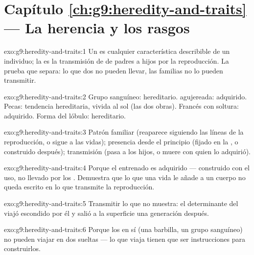 \section*{Capítulo \ref{ch:g9:heredity-and-traits} --- La herencia y los rasgos}

\begin{solution}{exo:g9:heredity-and-traits:1}
Un  es cualquier característica describible de un individuo; la
 es la transmisión de  de padres a hijos por la
reproducción. La prueba que separa: lo que dos  no pueden
llevar, las familias no lo pueden transmitir.
\end{solution}

\begin{solution}{exo:g9:heredity-and-traits:2}
Grupo sanguíneo: hereditario.  agujereada: adquirido. Pecas:
tendencia hereditaria, vivida al sol (las dos obras). Francés con
soltura: adquirido. Forma del lóbulo: hereditario.
\end{solution}

\begin{solution}{exo:g9:heredity-and-traits:3}
Patrón familiar (reaparece siguiendo las líneas de la reproducción, o
sigue a las vidas); presencia desde el principio (fijado en la
, o construido después); transmisión (pasa a los hijos, o
muere con quien lo adquirió).
\end{solution}

\begin{solution}{exo:g9:heredity-and-traits:4}
Porque el  entrenado es adquirido --- construido con el uso, no
llevado por los . Demuestra que lo que una vida le añade a un
cuerpo no queda escrito en lo que transmite la reproducción.
\end{solution}

\begin{solution}{exo:g9:heredity-and-traits:5}
Transmitir lo que no muestra: el determinante del  viajó
escondido por él y salió a la superficie una generación después.
\end{solution}

\begin{solution}{exo:g9:heredity-and-traits:6}
Porque los  en sí (una barbilla, un grupo sanguíneo) no pueden
viajar en dos  sueltas --- lo que viaja tienen que ser
instrucciones para construirlos.
\end{solution}

